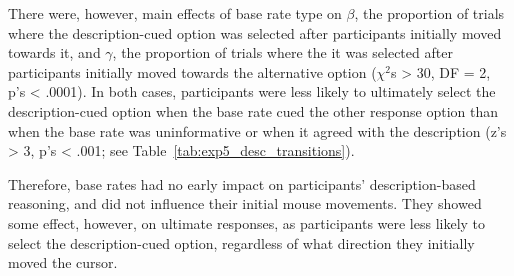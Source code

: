 There were, however, main effects of base rate type
on $\beta$, the proportion of trials where
the description-cued option was selected after
participants initially moved towards it,
and $\gamma$, the proportion of trials where
the it  was selected after
participants initially moved towards the alternative option
($\chi^2$s  > 30, DF = 2, p's < .0001).
In both cases, participants were less likely
to ultimately select the description-cued option
when the base rate cued the other response option
than when the base rate was uninformative
or when it agreed with the description
(z's > 3, p's < .001; see Table~\ref{tab:exp5_desc_transitions}).

Therefore, base rates had no early impact on participants'
description-based reasoning,
and did not influence their initial mouse movements.
They showed some effect, however, on ultimate responses,
as participants were less likely to select the description-cued option,
regardless of what direction they initially moved the cursor.
